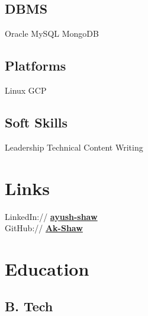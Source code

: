 \documentclass[]{deedy-resume-openfont}
\begin{document}
\begin{minipage}[t]{0.33\textwidth}
\subsection{DBMS}
Oracle \textbullet{} MySQL \textbullet{} MongoDB
\sectionsep

\subsection{Platforms}
Linux \textbullet{} GCP 
\sectionsep

\subsection{Soft Skills}
Leadership \textbullet{} Technical Content Writing 
\sectionsep


\section{Links} 
LinkedIn://  \href{https://www.linkedin.com/in/ayush-shaw}{\bf ayush-shaw} \\
GitHub://  \href{https://github.com/Ak-Shaw}{\bf Ak-Shaw} \\
\sectionsep


\section{Education} 


\subsection{B. Tech} 
\sectionsep



\end{minipage}
\end{document}
